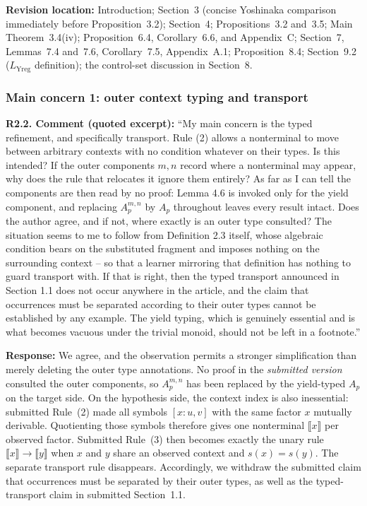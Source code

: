 \documentclass[
  10pt,
  a4paper,
]{article}
\newcommand{\NT}[1]{\llbracket #1\rrbracket}
\begin{document}
\textbf{Revision location:} Introduction; Section~3 (concise Yoshinaka
comparison immediately before Proposition~3.2); Section~4;
Propositions~3.2 and~3.5; Main Theorem~3.4(iv);
Proposition~6.4, Corollary~6.6, and Appendix~C; Section~7, Lemmas~7.4 and~7.6,
Corollary~7.5, Appendix~A.1; Proposition~8.4; Section~9.2 ($L_{\mathrm{Yreg}}$ definition);
the control-set discussion in Section~8.


\subsubsection{Main concern 1: outer context typing and
transport}\label{main-concern-1-outer-context-typing-and-transport}

\textbf{R2.2. Comment (quoted excerpt):} ``My main concern is the typed
refinement, and specifically transport. Rule (2) allows a nonterminal to
move between arbitrary contexts with no condition whatever on their
types. Is this intended? If the outer components $m,n$ record where a
nonterminal may appear, why does the rule that relocates it ignore them
entirely? As far as I can tell the components are then read by no proof:
Lemma 4.6 is invoked only for the yield component, and replacing
$A^{m,n}_{p}$ by $A_{p}$ throughout leaves every result intact. Does the
author agree, and if not, where exactly is an outer type consulted? The
situation seems to me to follow from Definition 2.3 itself, whose algebraic
condition bears on the substituted fragment and imposes nothing on the
surrounding context -- so that a learner mirroring that definition has
nothing to guard transport with. If that is right, then the typed transport
announced in Section 1.1 does not occur anywhere in the article, and the
claim that occurrences must be separated according to their outer types
cannot be established by any example. The yield typing, which is genuinely
essential and is what becomes vacuous under the trivial monoid, should not
be left in a footnote.''

\textbf{Response:} We agree, and the observation permits a
stronger simplification than merely deleting the outer type annotations.
No proof in the \emph{submitted version} consulted the outer components, so
$A^{m,n}_p$ has been replaced by the yield-typed $A_p$ on the target side.
On the hypothesis side, the context index is also inessential: submitted
Rule~(2) made all symbols $[x:u,v]$ with the same factor $x$ mutually
derivable.  Quotienting those symbols therefore gives one nonterminal $\NT{x}$
per observed factor.  Submitted Rule~(3) then becomes exactly the unary rule
$\NT{x}\to\NT{y}$ when $x$ and $y$ share an observed context and
$s(x)=s(y)$.  The separate transport rule disappears.
Accordingly, we withdraw the submitted claim that occurrences must be
separated by their outer types, as well as the typed-transport claim in
submitted Section~1.1.
\end{document}

